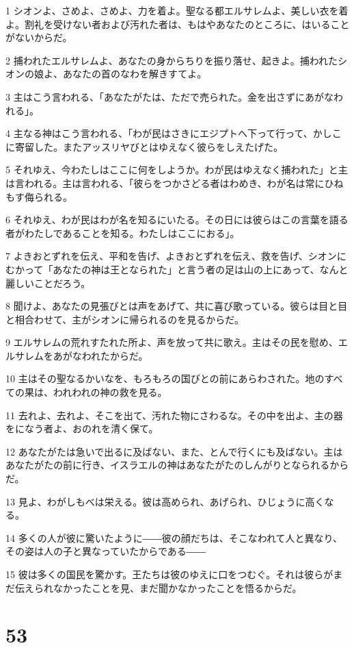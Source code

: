 \par 1 シオンよ、さめよ、さめよ、力を着よ。聖なる都エルサレムよ、美しい衣を着よ。割礼を受けない者および汚れた者は、もはやあなたのところに、はいることがないからだ。
\par 2 捕われたエルサレムよ、あなたの身からちりを振り落せ、起きよ。捕われたシオンの娘よ、あなたの首のなわを解きすてよ。
\par 3 主はこう言われる、「あなたがたは、ただで売られた。金を出さずにあがなわれる」。
\par 4 主なる神はこう言われる、「わが民はさきにエジプトへ下って行って、かしこに寄留した。またアッスリヤびとはゆえなく彼らをしえたげた。
\par 5 それゆえ、今わたしはここに何をしようか。わが民はゆえなく捕われた」と主は言われる。主は言われる、「彼らをつかさどる者はわめき、わが名は常にひねもす侮られる。
\par 6 それゆえ、わが民はわが名を知るにいたる。その日には彼らはこの言葉を語る者がわたしであることを知る。わたしはここにおる」。
\par 7 よきおとずれを伝え、平和を告げ、よきおとずれを伝え、救を告げ、シオンにむかって「あなたの神は王となられた」と言う者の足は山の上にあって、なんと麗しいことだろう。
\par 8 聞けよ、あなたの見張びとは声をあげて、共に喜び歌っている。彼らは目と目と相合わせて、主がシオンに帰られるのを見るからだ。
\par 9 エルサレムの荒れすたれた所よ、声を放って共に歌え。主はその民を慰め、エルサレムをあがなわれたからだ。
\par 10 主はその聖なるかいなを、もろもろの国びとの前にあらわされた。地のすべての果は、われわれの神の救を見る。
\par 11 去れよ、去れよ、そこを出て、汚れた物にさわるな。その中を出よ、主の器をになう者よ、おのれを清く保て。
\par 12 あなたがたは急いで出るに及ばない、また、とんで行くにも及ばない。主はあなたがたの前に行き、イスラエルの神はあなたがたのしんがりとなられるからだ。
\par 13 見よ、わがしもべは栄える。彼は高められ、あげられ、ひじょうに高くなる。
\par 14 多くの人が彼に驚いたように――彼の顔だちは、そこなわれて人と異なり、その姿は人の子と異なっていたからである――
\par 15 彼は多くの国民を驚かす。王たちは彼のゆえに口をつむぐ。それは彼らがまだ伝えられなかったことを見、まだ聞かなかったことを悟るからだ。

\chapter{53}

